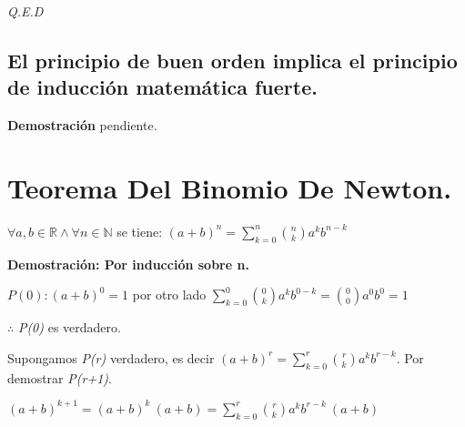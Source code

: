 \documentclass{book}
\begin{document}
\textit{Q.E.D}

\subsection{El principio de buen orden implica el principio de inducción matemática fuerte.}

\textbf{Demostración} pendiente.

\section{Teorema Del Binomio De Newton.}
$\forall a,b\in{\mathbb{R}}\land \forall{n\in{\mathbb{N}}}$ se tiene:
$(a+b)^n=\sum_{k=0}^n \binom{n}{k} a^kb^{n-k}$

\textbf{Demostración: Por inducción sobre n.}

$P(0):(a+b)^0=1$ por otro lado $\sum_{k=0}^0 \binom{0}{k} a^kb^{0-k}=\binom{0}{0}a^0b^0=1$

$\therefore$ \textit{P(0)} es verdadero.

Supongamos \textit{P(r)} verdadero, es decir $(a+b)^r=\sum_{k=0}^r \binom{r}{k} a^kb^{r-k}$.
Por demostrar \textit{P(r+1)}.

$(a+b)^{k+1}=(a+b)^k \ (a+b)=\sum_{k=0}^r \binom{r}{k} a^kb^{r-k} \ (a+b)$
\end{document}
